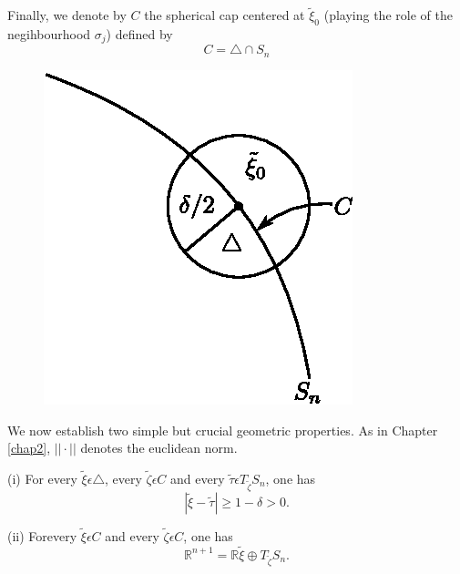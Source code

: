 Finally, we denote by $C$ the spherical cap centered at
$\widetilde{\xi}_{0}$ (playing the role of the negihbourhood
$\sigma_{j}$) defined by
\begin{equation*}
C = \triangle \cap S_{n}\tag{2.2}\label{chap4-eq2.2}
\end{equation*}
\begin{figure}[H]
\centering
\includegraphics{figure/fig76-2.1_1.eps}
\caption{}
\end{figure}


We now establish two simple but crucial geometric properties. As in
Chapter \ref{chap2}, $||\cdot||$ denotes the euclidean norm.

\begin{lemma}\label{chap4-lem2.1}
(i) For every $\widetilde{\xi} \epsilon \triangle$, every
  $\widetilde{\zeta} \epsilon C$ and every $\widetilde{\tau} \epsilon
  T_{\widetilde{\zeta}} S_{n}$, one has
$$
|\widetilde{\xi} - \widetilde{\tau}| \geq 1 - \delta > 0.
$$

(ii) For\pageoriginale every $\widetilde{\xi} \epsilon C$ and every
$\widetilde{\zeta} \epsilon C$, one has
$$
\mathbb{R}^{n+1} = \mathbb{R} \widetilde{\xi} \oplus T_{\widetilde{\zeta}}S_{n}.
$$
\end{lemma}

